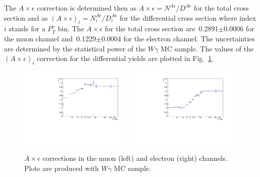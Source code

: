 The $A \times \epsilon$ correction is determined then as $A \times \epsilon = N^{A\epsilon}/D^{A\epsilon}$ for the total cross section and as $(A \times \epsilon)_i = N^{A\epsilon}_i/{D^{A\epsilon}_i}$ for the differential cross section where index $i$ stands for a $P_T^{\gamma}$ bin. The $A \times \epsilon$ for the total cross section are~0.2891$\pm$0.0006 for the muon channel and~0.1229$\pm$0.0004 for the electron channel. The uncertainties are determined by the statistical power of the $W\gamma$ MC sample. The values of the $(A \times \epsilon)_i$ correction for the differential yields are plotted in Fig.~\ref{fig:accXeff_Wg}.

\begin{figure}[htb]
  \begin{center}
  \includegraphics[width=0.48\textwidth]{../figs/figs_v11/MUON_WGamma/Constants/C_accXeff_MUON_WGamma.pdf}  \includegraphics[width=0.48\textwidth]{../figs/figs_v11/ELECTRON_WGamma/Constants/C_accXeff_ELECTRON_WGamma.pdf}\\
  \label{fig:accXeff_Wg}
  \caption{$A\times\epsilon$ corrections in the muon (left) and electron (right) channels. Plots are produced with $W\gamma$ MC sample. }
  \end{center}
\end{figure}


